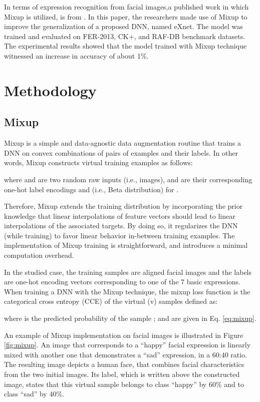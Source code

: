 \documentclass[10pt,twocolumn,letterpaper]{article}
\begin{document}
In terms of expression recognition from facial images,a published work in which Mixup is utilized, is from  \cite{riaz2020exnet}. In this paper, the researchers made use of Mixup to improve the generalization of a proposed DNN, named eXnet. The model was trained and evaluated on FER-2013, CK+, and RAF-DB benchmark datasets. The experimental results showed that the model trained with Mixup technique witnessed an increase in accuracy of about 1\%. 



\section{Methodology}
\subsection{Mixup}
Mixup \cite{zhang2017mixup} is a simple and data-agnostic data augmentation routine that trains a DNN on convex combinations of pairs of examples and their labels. In other words, Mixup constructs virtual training examples  as follows:



\noindent where  and  are two random raw inputs (i.e., images),  and   are their corresponding one-hot label encodings  and   (i.e., Beta distribution) for . 


Therefore, Mixup extends the training distribution by incorporating the prior knowledge that linear interpolations of feature vectors should lead to linear interpolations of the associated targets. By doing so, it regularizes the DNN (while training) to favor linear behavior in-between training examples. The implementation of Mixup training is straightforward, and introduces a minimal computation overhead. 

In the studied case, the training samples are aligned facial images and the labels are one-hot encoding vectors corresponding to one of the 7 basic expressions. When training a DNN with the Mixup technique, the mixup loss function is the categorical cross entropy (CCE) of the virtual (v) samples defined as:




where    is the predicted probability of the sample ;  and  are given in Eq. \ref{eq:mixup}.



An example of Mixup implementation on facial images is illustrated in Figure \ref{fig:mixup}. An image that corresponds to a \enquote{happy} facial expression is linearly mixed with another one that demonstrates a \enquote{sad} expression, in a 60:40 ratio. The resulting image depicts a human face, that combines facial characteristics from the two initial images. Its label, which is written above the constructed image, states that this virtual sample belongs to class \enquote{happy} by 60\% and to class \enquote{sad} by 40\%. 
\end{document}
